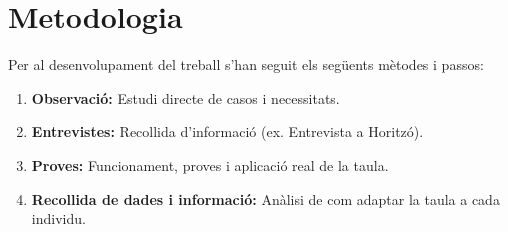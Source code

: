 \chapter{Metodologia}
Per al desenvolupament del treball s'han seguit els següents mètodes i passos:
\begin{enumerate}
    \item \textbf{Observació:} Estudi directe de casos i necessitats.
    \item \textbf{Entrevistes:} Recollida d'informació (ex. Entrevista a Horitzó).
    \item \textbf{Proves:} Funcionament, proves i aplicació real de la taula.
    \item \textbf{Recollida de dades i informació:} Anàlisi de com adaptar la taula a cada individu.
\end{enumerate}
